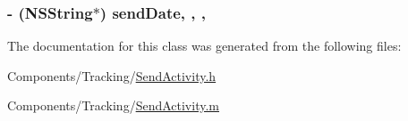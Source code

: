 \hypertarget{interface_send_activity_ae36769174b1db462665442e41de83890}{
\subsubsection[{send\-Date}]{\setlength{\rightskip}{0pt plus 5cm}-\/ (N\-S\-String$\ast$) send\-Date\hspace{0.3cm}{\ttfamily [read]}, {\ttfamily [write]}, {\ttfamily [nonatomic]}, {\ttfamily [strong]}}}\label{interface_send_activity_ae36769174b1db462665442e41de83890}


The documentation for this class was generated from the following files\-:\begin{DoxyCompactItemize}
\item 
Components/\-Tracking/\hyperlink{_send_activity_8h}{Send\-Activity.\-h}\item 
Components/\-Tracking/\hyperlink{_send_activity_8m}{Send\-Activity.\-m}\end{DoxyCompactItemize}
